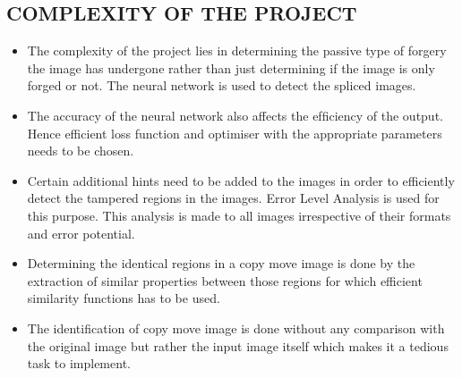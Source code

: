 \subsection{COMPLEXITY OF THE PROJECT}
\begin{itemize}
    \item  The complexity of the project lies in determining the passive type of forgery the image has undergone  rather than just determining if the image is only forged or not. The neural network is used to detect the spliced images.
    \item The accuracy of the neural network also affects the efﬁciency of the output. Hence efficient loss function and optimiser with the appropriate parameters needs to be chosen. 
    \item Certain additional hints need to be added to the images in order to efficiently detect the tampered regions in the images. Error Level Analysis is used for this purpose. This analysis is made to all images irrespective of their formats and error potential.  
    \item Determining the identical regions in a copy move image is done by the extraction of similar properties between those regions for which efficient similarity functions has to be used. 
    \item The identification of copy move image is done without any comparison with the original image but rather the input image itself which makes it a tedious task to implement.
\end{itemize}